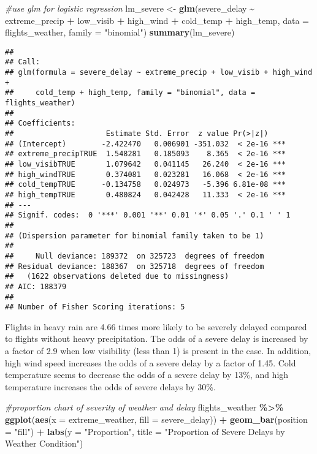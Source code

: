 \documentclass[
]{article}
\newenvironment{Shaded}{\begin{snugshade}}{\end{snugshade}}
\newcommand{\AttributeTok}[1]{\textcolor[rgb]{0.13,0.29,0.53}{#1}}
\newcommand{\CommentTok}[1]{\textcolor[rgb]{0.56,0.35,0.01}{\textit{#1}}}
\newcommand{\FunctionTok}[1]{\textcolor[rgb]{0.13,0.29,0.53}{\textbf{#1}}}
\newcommand{\NormalTok}[1]{#1}
\newcommand{\OtherTok}[1]{\textcolor[rgb]{0.56,0.35,0.01}{#1}}
\newcommand{\SpecialCharTok}[1]{\textcolor[rgb]{0.81,0.36,0.00}{\textbf{#1}}}
\newcommand{\StringTok}[1]{\textcolor[rgb]{0.31,0.60,0.02}{#1}}
\begin{document}
\begin{Shaded}
\begin{Highlighting}[]
\CommentTok{\#use glm for logistic regression}
\NormalTok{lm\_severe }\OtherTok{\textless{}{-}} \FunctionTok{glm}\NormalTok{(severe\_delay }\SpecialCharTok{\textasciitilde{}}\NormalTok{ extreme\_precip }\SpecialCharTok{+}\NormalTok{ low\_visib }\SpecialCharTok{+}\NormalTok{ high\_wind }\SpecialCharTok{+}\NormalTok{ cold\_temp }\SpecialCharTok{+}\NormalTok{ high\_temp, }\AttributeTok{data =}\NormalTok{ flights\_weather, }\AttributeTok{family =} \StringTok{"binomial"}\NormalTok{)}
\FunctionTok{summary}\NormalTok{(lm\_severe)}
\end{Highlighting}
\end{Shaded}

\begin{verbatim}
## 
## Call:
## glm(formula = severe_delay ~ extreme_precip + low_visib + high_wind + 
##     cold_temp + high_temp, family = "binomial", data = flights_weather)
## 
## Coefficients:
##                     Estimate Std. Error  z value Pr(>|z|)    
## (Intercept)        -2.422470   0.006901 -351.032  < 2e-16 ***
## extreme_precipTRUE  1.548281   0.185093    8.365  < 2e-16 ***
## low_visibTRUE       1.079642   0.041145   26.240  < 2e-16 ***
## high_windTRUE       0.374081   0.023281   16.068  < 2e-16 ***
## cold_tempTRUE      -0.134758   0.024973   -5.396 6.81e-08 ***
## high_tempTRUE       0.480824   0.042428   11.333  < 2e-16 ***
## ---
## Signif. codes:  0 '***' 0.001 '**' 0.01 '*' 0.05 '.' 0.1 ' ' 1
## 
## (Dispersion parameter for binomial family taken to be 1)
## 
##     Null deviance: 189372  on 325723  degrees of freedom
## Residual deviance: 188367  on 325718  degrees of freedom
##   (1622 observations deleted due to missingness)
## AIC: 188379
## 
## Number of Fisher Scoring iterations: 5
\end{verbatim}

Flights in heavy rain are 4.66 times more likely to be severely delayed
compared to flights without heavy precipitation. The odds of a severe
delay is increased by a factor of 2.9 when low visibility (less than 1)
is present in the case. In addition, high wind speed increases the odds
of a severe delay by a factor of 1.45. Cold temperature seems to
decrease the odds of a severe delay by 13\%, and high temperature
increases the odds of severe delays by 30\%.

\begin{Shaded}
\begin{Highlighting}[]
\CommentTok{\#proportion chart of severity of weather and delay}
\NormalTok{flights\_weather }\SpecialCharTok{\%\textgreater{}\%}
  \FunctionTok{ggplot}\NormalTok{(}\FunctionTok{aes}\NormalTok{(}\AttributeTok{x =}\NormalTok{ extreme\_weather, }\AttributeTok{fill =}\NormalTok{ severe\_delay)) }\SpecialCharTok{+}
  \FunctionTok{geom\_bar}\NormalTok{(}\AttributeTok{position =} \StringTok{"fill"}\NormalTok{) }\SpecialCharTok{+}
  \FunctionTok{labs}\NormalTok{(}\AttributeTok{y =} \StringTok{"Proportion"}\NormalTok{, }\AttributeTok{title =} \StringTok{"Proportion of Severe Delays by Weather Condition"}\NormalTok{)}
\end{Highlighting}
\end{Shaded}
\end{document}
